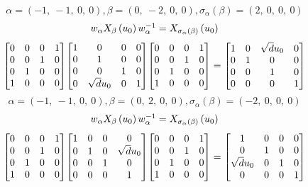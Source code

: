 \documentclass[11pt]{article}
\theoremstyle{definition}
\begin{document}
\[
\alpha = \left( -1, \  -1, \  0, \  0\right), \beta = \left( 0, \  -2, \  0, \  0\right), \sigma_{\alpha}(\beta) = \left( 2, \  0, \  0, \  0\right)
\]
\[
\scaletoalign{\textwidth}{w_{\alpha} X_{\beta}\left(u_{0}\right) w_{\alpha}^{-1} = X_{\sigma_{\alpha}\left(\beta\right)}\left(u_{0}\right)}
\]
\[
\scaletoalign{\textwidth}{{\left[\begin{matrix}0 & 0 & 0 & 1\\0 & 0 & 1 & 0\\0 & 1 & 0 & 0\\1 & 0 & 0 & 0\end{matrix}\right]} {\left[\begin{matrix}1 & 0 & 0 & 0\\0 & 1 & 0 & 0\\0 & 0 & 1 & 0\\0 & \sqrt{d} u_{0} & 0 & 1\end{matrix}\right]} {\left[\begin{matrix}0 & 0 & 0 & 1\\0 & 0 & 1 & 0\\0 & 1 & 0 & 0\\1 & 0 & 0 & 0\end{matrix}\right]} = {\left[\begin{matrix}1 & 0 & \sqrt{d} u_{0} & 0\\0 & 1 & 0 & 0\\0 & 0 & 1 & 0\\0 & 0 & 0 & 1\end{matrix}\right]}}
\]
\[
\alpha = \left( -1, \  -1, \  0, \  0\right), \beta = \left( 0, \  2, \  0, \  0\right), \sigma_{\alpha}(\beta) = \left( -2, \  0, \  0, \  0\right)
\]
\[
\scaletoalign{\textwidth}{w_{\alpha} X_{\beta}\left(u_{0}\right) w_{\alpha}^{-1} = X_{\sigma_{\alpha}\left(\beta\right)}\left(u_{0}\right)}
\]
\[
\scaletoalign{\textwidth}{{\left[\begin{matrix}0 & 0 & 0 & 1\\0 & 0 & 1 & 0\\0 & 1 & 0 & 0\\1 & 0 & 0 & 0\end{matrix}\right]} {\left[\begin{matrix}1 & 0 & 0 & 0\\0 & 1 & 0 & \sqrt{d} u_{0}\\0 & 0 & 1 & 0\\0 & 0 & 0 & 1\end{matrix}\right]} {\left[\begin{matrix}0 & 0 & 0 & 1\\0 & 0 & 1 & 0\\0 & 1 & 0 & 0\\1 & 0 & 0 & 0\end{matrix}\right]} = {\left[\begin{matrix}1 & 0 & 0 & 0\\0 & 1 & 0 & 0\\\sqrt{d} u_{0} & 0 & 1 & 0\\0 & 0 & 0 & 1\end{matrix}\right]}}
\]
\end{document}
